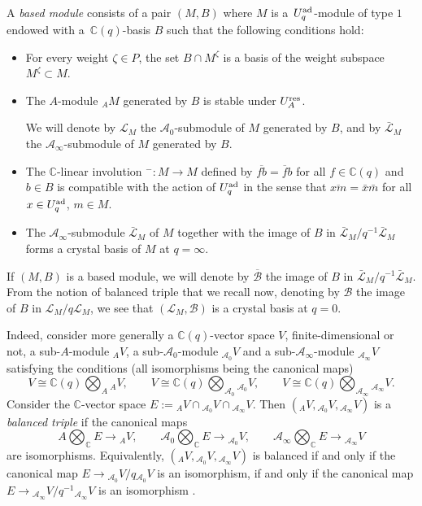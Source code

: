 \documentclass[pdftex]{sigma}
\numberwithin{equation}{section}
\theoremstyle{definition}
\newcommand{\mc}{\mathbb{C}}
\newcommand{\Ll}{{\mathcal L}}
\newcommand{\ra}{\rightarrow}
\begin{document}
 A {\it based module} consists of a pair $(M,B)$ where $M$ is a~$U_q^{\rm ad}$-module of type $1$ endowed with a~$\mc(q)$-basis $B$ such that the following conditions hold:
\begin{itemize}\itemsep=0pt
\item[(i)] For every weight $\zeta\in P$, the set $B\cap M^{\zeta}$ is a basis of the weight subspace $M^{\zeta}\subset M$.
\item[(ii)] The $A$-module ${}_A M$ generated by $B$ is stable under $U_A^{\rm res}$.


We will denote by $\Ll_M$ the $\mathcal{A}_0$-submodule of $M$ generated by $B$, and by $\bar{\Ll}_M$ the $\mathcal{A}_\infty$-submodule of $M$ generated by $B$.


\item[(iii)] The $\mc$-linear involution ${}^-\colon M\ra M$ defined by $\overline{fb} = \overline{f}b$ for all $f\in \mc(q)$ and $b\in B$ is compatible with the action of $U_q^{\rm ad}$ in the sense that $\overline{xm} = \bar{x}\bar{m}$ for all $x\in U_q^{\rm ad}$, $m\in M$.
\item[(iv)] The $\mathcal{A}_\infty$-submodule $\bar{\Ll}_M$ of $M$ together with the image of $B$ in $\bar{\Ll}_M/q^{-1}\bar{\Ll}_M$ forms a crystal basis of $M$ at $q=\infty$.
\end{itemize}
If $(M,B)$ is a based module, we will denote by $\overline{\mathcal{B}}$ the image of $B$ in $\bar{\Ll}_M/q^{-1}\bar{\Ll}_M$. From the notion of balanced triple that we recall now, denoting by $\mathcal{B}$ the image of $B$ in $\Ll_M/q\Ll_M$, we see that $(\Ll_M,\mathcal{B})$ is a crystal basis at $q=0$.

Indeed, consider more generally a $\mc(q)$-vector space $V$, finite-dimensional or not, a sub-$A$-module ${}_AV$, a sub-$\mathcal{A}_0$-module ${}_{\mathcal{A}_0}V$ and a sub-$\mathcal{A}_\infty$-module ${}_{\mathcal{A}_\infty}V$ satisfying the conditions (all isomorphisms being the canonical maps)
\[V\cong \mc(q) \bigotimes_A {}_AV ,\qquad V\cong \mc(q) \bigotimes_{\mathcal{A}_0} {}_{\mathcal{A}_0}V ,\qquad V\cong \mc(q) \bigotimes_{\mathcal{A}_\infty} {}_{\mathcal{A}_\infty}V.\]
Consider the $\mc$-vector space $E := {}_AV \cap {}_{\mathcal{A}_0}V \cap {}_{\mathcal{A}_\infty}V$. Then $({}_AV, {}_{\mathcal{A}_0}V,{}_{\mathcal{A}_\infty}V)$ is a {\it balanced triple} \cite{Kashiwara1,Kashiwara2} if the canonical maps
\begin{equation}\label{condbalanced}
A \bigotimes_\mc E \ra {}_AV,\qquad \mathcal{A}_0 \bigotimes_\mc E \ra {}_{\mathcal{A}_0}V ,\qquad \mathcal{A}_\infty \bigotimes_\mc E \ra {}_{\mathcal{A}_\infty}V
\end{equation}
are isomorphisms. Equivalently, $({}_AV, {}_{\mathcal{A}_0}V,{}_{\mathcal{A}_\infty}V)$ is balanced if and only if the canonical map $E \ra {}_{\mathcal{A}_0}V/q{}_{\mathcal{A}_0}V$ is an isomorphism, if and only if the canonical map $E \ra {}_{\mathcal{A}_\infty}V/q^{-1}{}_{\mathcal{A}_\infty}V$ is an isomorphism \cite[Lemma 2.1.1]{Kashiwara2}.
\end{document}
